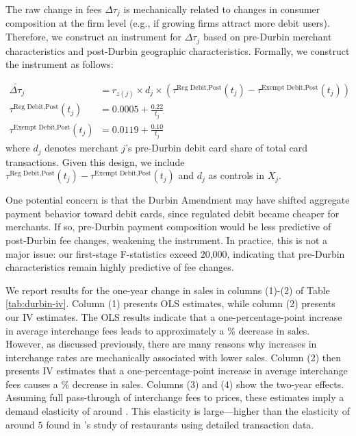 \documentclass[main.tex]{subfiles}
\begin{document}
The raw change in fees $\Delta \tau_j$ is mechanically related to changes in consumer composition at the firm level (e.g., if growing firms attract more debit users).
Therefore, we construct an instrument for $\Delta \tau_j$ based on pre-Durbin merchant characteristics and post-Durbin geographic characteristics.
Formally, we construct the instrument as follows:

\begin{align}\widetilde{\Delta\tau_{j}} & = r_{z(j)}\times d_{j}\times\left(\tau^{\text{Reg Debit,Post}}(t_{j})-\tau^{\text{Exempt Debit,Post}}(t_{j})\right) \\
    \tau^{\text{Reg Debit,Post}}(t_{j}) & = 0.0005 + \frac{0.22}{t_j} \\
    \tau^{\text{Exempt Debit,Post}}(t_{j}) & = 0.0119 + \frac{0.10}{t_j}
\end{align}
where $d_j$ denotes merchant $j$'s pre-Durbin debit card share of total card transactions. Given this design, we include $\tau^{\text{Reg Debit,Post}}(t_{j}) - \tau^{\text{Exempt Debit,Post}}(t_{j})$ and $d_j$ as controls in $X_j$.

One potential concern is that the Durbin Amendment may have shifted aggregate payment behavior toward debit cards, since regulated debit became cheaper for merchants.
If so, pre-Durbin payment composition would be less predictive of post-Durbin fee changes, weakening the instrument.
In practice, this is not a major issue: our first-stage F-statistics exceed 20,000, indicating that pre-Durbin characteristics remain highly predictive of fee changes.

We report results for the one-year change in sales in columns (1)-(2) of Table \ref{tab:durbin-iv}.
Column (1) presents OLS estimates, while column (2) presents our IV estimates.
The OLS results indicate that a one-percentage-point increase in average interchange fees leads to approximately a \% decrease in sales.
However, as discussed previously, there are many reasons why increases in interchange rates are mechanically associated with lower sales.
Column (2) then presents IV estimates that a one-percentage-point increase in average interchange fees causes a \% decrease in sales.
Columns (3) and (4) show the two-year effects.
Assuming full pass-through of interchange fees to prices, these estimates imply a demand elasticity of around .
This elasticity is large---higher than the elasticity of around $5$ found in \citet{Sullivan2024}'s study of restaurants using detailed transaction data.
\end{document}
